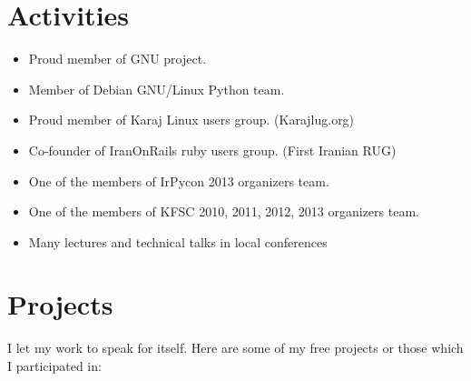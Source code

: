 \documentclass[a4paper,11pt]{article}
\begin{document}
\section*{Activities}
\begin{itemize}
\item Proud member of GNU project.
\item Member of Debian GNU/Linux Python team.
\item Proud member of Karaj Linux users group. (Karajlug.org)
\item Co-founder of IranOnRails ruby users group. (First Iranian RUG)
\item One of the members of IrPycon 2013 organizers team.
\item One of the members of KFSC 2010, 2011, 2012, 2013 organizers team.
\item Many lectures and technical talks in local conferences
\end{itemize}

\section*{Projects}
I let my work to speak for itself. Here are some of my free projects
or those which I participated in:\\
\end{document}
